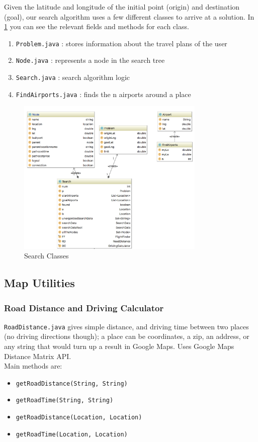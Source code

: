 \documentclass[11pt]{article}
\begin{document}
Given the latitude and longitude of the initial point (origin) and destination (goal), our search algorithm uses a few different classes to arrive at a solution.
In \ref{fig:suml} you can see the relevant fields and methods for each class.
\begin{enumerate}
\item \texttt{Problem.java} : stores information about the travel plans of the user 
\item \texttt{Node.java} : represents a node in the search tree
\item \texttt{Search.java} : search algorithm logic
\item \texttt{FindAirports.java} : finds the n airports around a place
\end{enumerate}

\begin{figure}[!ht]
  \centering
  \includegraphics[width=0.8\textwidth]{searchuml.png}
  \caption{Search Classes}
  \label{fig:suml}
\end{figure}

\pagebreak

\subsection{Map Utilities}

\subsubsection{Road Distance and Driving Calculator }

\texttt{RoadDistance.java} gives simple distance, and driving time between two places (no driving
directions though); a place can be coordinates, a zip, an address, or any string that would turn up a result in Google Maps. Uses Google Maps
Distance Matrix API. \\
Main methods are: 
\begin{itemize}
\item \texttt{getRoadDistance(String, String)}
\item \texttt{getRoadTime(String, String)}
\item \texttt{getRoadDistance(Location, Location)}
\item \texttt{getRoadTime(Location, Location)}
\end{itemize}
\end{document}
